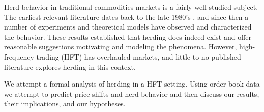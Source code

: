\label{abstract}

Herd behavior in traditional commodities markets is a fairly well-studied subject.
The earliest relevant literature dates back to the late 1980's \cite{bikhchandani}, and since then a number of experiments and theoretical models have observed and characterized the behavior.
These results established that herding does indeed exist and offer reasonable suggestions motivating and modeling the phenomena.
However, high-frequency trading (HFT) has overhauled markets, and little to no published literature explores herding in this context.

We attempt a formal analysis of herding in a HFT setting. 
Using order book data we attempt to predict price shifts and herd behavior and then discuss our results, their implications, and our hypotheses.
